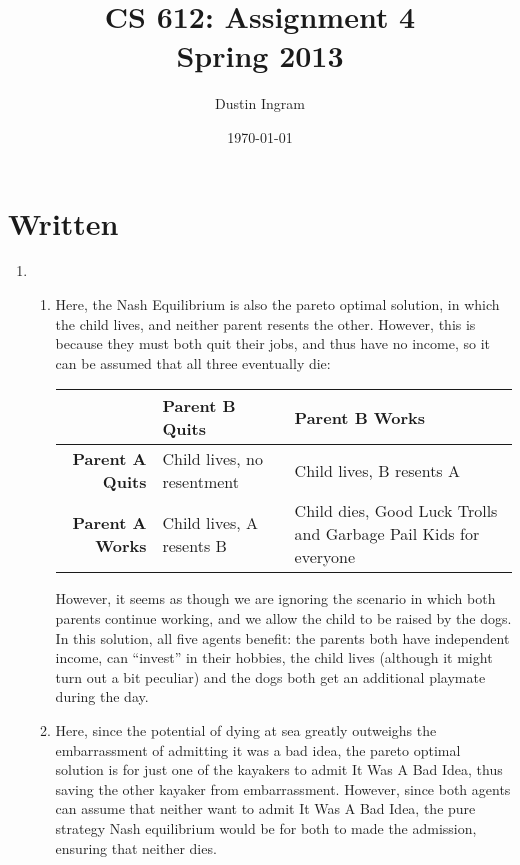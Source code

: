 \documentclass{article}
\title{CS 612: Assignment 4\\Spring 2013}
\author{Dustin Ingram}
\date{\today}
\begin{document}
\maketitle

\section*{Written}

\begin{enumerate}

\item{} %

\begin{enumerate}

\item{} %

Here, the Nash Equilibrium is also the pareto optimal solution, in which the child lives, and neither parent resents the other. However, this is because they must both quit their jobs, and thus have no income, so it can be assumed that all three eventually die:

\begin{center}
  \begin{tabular}{ r || p{3cm} | p{3cm} }
      & \textbf{Parent B Quits} & \textbf{Parent B Works} \\ \hline \hline
    \textbf{Parent A Quits} & Child lives, no resentment & Child lives, B resents A \\ \hline
    \textbf{Parent A Works} & Child lives, A resents B & Child dies, Good Luck Trolls and Garbage Pail Kids for everyone \\
  \end{tabular}
\end{center}

However, it seems as though we are ignoring the scenario in which both parents continue working, and we allow the child to be raised by the dogs. In this solution, all five agents benefit: the parents both have independent income, can ``invest'' in their hobbies, the child lives (although it might turn out a bit peculiar) and the dogs both get an additional playmate during the day.

\item{} %

Here, since the potential of dying at sea greatly outweighs the embarrassment of admitting it was a bad idea, the pareto optimal solution is for just one of the kayakers to admit It Was A Bad Idea, thus saving the other kayaker from embarrassment. However, since both agents can assume that neither want to admit It Was A Bad Idea, the pure strategy Nash equilibrium would be for both to made the admission, ensuring that neither dies.


\end{enumerate}
\end{enumerate}
\end{document}
